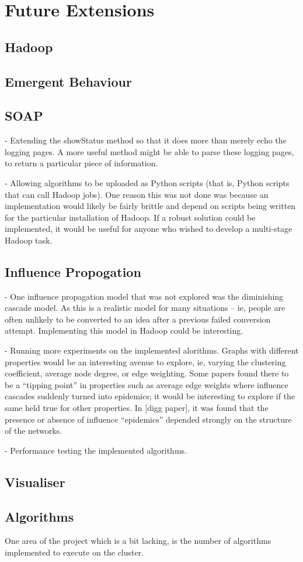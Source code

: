 \section{Future Extensions}


\subsection{Hadoop}

\subsection{Emergent Behaviour}

\subsection{SOAP}

- Extending the showStatus method so that it does more than merely echo the logging pages. A more useful method might be able to parse these logging pages, to return a particular piece of information.

- Allowing algorithms to be uploaded as Python scripts (that is, Python scripts that can call Hadoop jobs). One reason this was not done was because an implementation would likely be fairly brittle and depend on scripts being written for the particular installation of Hadoop. If a robust solution could be implemented, it would be useful for anyone who wished to develop a multi-stage Hadoop task. 

\subsection{Influence Propogation}

- One influence propagation model that was not explored was the diminishing cascade model. As this is a realistic model for many situations -- ie, people are often unlikely to be converted to an idea after a previous failed conversion attempt. Implementing this model in Hadoop could be interesting.

- Running more experiments on the implemented alorithms. Graphs with different properties would be an interesting avenue to explore, ie, varying the clustering coefficient, average node degree, or edge weighting. Some papers found there to be a ``tipping point'' in properties such as average edge weights where influence cascades suddenly turned into epidemics; it would be interesting to explore if the same held true for other properties. In [digg paper], it was found that the presence or absence of influence ``epidemics'' depended strongly on the structure of the networks.

- Performance testing the implemented algorithms.

\subsection{Visualiser}

\subsection{Algorithms}
One area of the project which is a bit lacking, is the number of algorithms implemented to execute on the cluster. 
